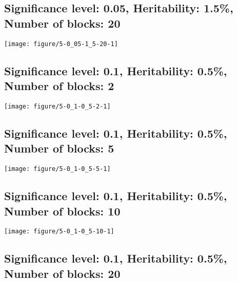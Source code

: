 \documentclass[11pt,letter]{article}\usepackage[]{graphicx}\usepackage[]{color}
\makeatletter
\def\maxwidth{ %
  \ifdim\Gin@nat@width>\linewidth
    \linewidth
  \else
    \Gin@nat@width
  \fi
}
\newenvironment{knitrout}{}{} %
\makeatother
\begin{document}
\newpage
\subsection{Significance level: 0.05, Heritability: 1.5\%, Number of blocks: 20}

\begin{knitrout}
\color{fgcolor}
\texttt{[image: figure/5-0\_05-1\_5-20-1]} 

\end{knitrout}

\newpage
\subsection{Significance level: 0.1, Heritability: 0.5\%, Number of blocks: 2}

\begin{knitrout}
\color{fgcolor}
\texttt{[image: figure/5-0\_1-0\_5-2-1]} 

\end{knitrout}

\newpage
\subsection{Significance level: 0.1, Heritability: 0.5\%, Number of blocks: 5}

\begin{knitrout}
\color{fgcolor}
\texttt{[image: figure/5-0\_1-0\_5-5-1]} 

\end{knitrout}

\newpage
\subsection{Significance level: 0.1, Heritability: 0.5\%, Number of blocks: 10}

\begin{knitrout}
\color{fgcolor}
\texttt{[image: figure/5-0\_1-0\_5-10-1]} 

\end{knitrout}

\newpage
\subsection{Significance level: 0.1, Heritability: 0.5\%, Number of blocks: 20}
\end{document}
